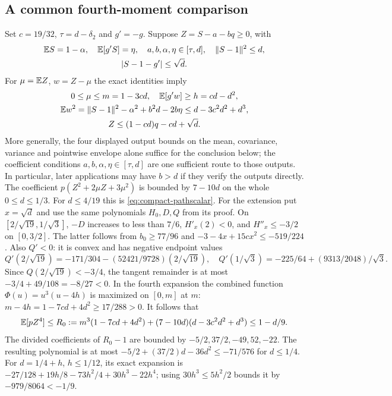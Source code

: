 \subsection{A common fourth-moment comparison}\label{calc:fourthcomparison}
Set $c=19/32$, $\tau=d-\delta_{2}$ and $g'=-g$. Suppose $Z=S-a-bq\ge0$, with
\begin{gather*}
 \mathbb E S=1-\alpha,\quad\mathbb E[g'S]=\eta,\quad
 a,b,\alpha,\eta\in[\tau,d],\quad\|S-1\|^2\le d,\\
 |S-1-g'|\le\sqrt d.
\end{gather*}
For $\mu=\mathbb E Z$, $w=Z-\mu$ the exact identities imply
\begin{gather*}
 0\le\mu\le m=1-3cd,\quad \mathbb E[g'w]\ge h=cd-d^2,\\
 \mathbb E w^2=\|S-1\|^2-\alpha^2+b^2d-2b\eta
                  \le d-3c^2d^2+d^3,\\
 Z\le(1-cd)q-cd+\sqrt d.
\end{gather*}
More generally, the four displayed output bounds on the mean, covariance,
variance and pointwise envelope alone suffice for the conclusion below;
the coefficient conditions $a,b,\alpha,\eta\in[\tau,d]$ are one
sufficient route to those outputs. In particular, later applications
may have $b>d$ if they verify the outputs directly.
The coefficient $p(Z^2+2\mu Z+3\mu^2)$ is bounded by $7-10d$ on the
whole $0\le d\le1/3$. For $d\le4/19$ this is
\eqref{eq:compact-pathscalar}. For the extension put $x=\sqrt d$ and use
the same polynomials $H_0,D,Q$ from its proof. On
$[2/\sqrt{19},1/\sqrt3]$, $-D$ increases to less than $7/6$,
$H'_x(2)<0$, and $H''_x\le-3/2$ on $[0,3/2]$.
The latter follows from $b_0\ge77/96$ and
$-3-4x+15cx^2\le-519/224$.
Also $Q'<0$: it is convex and has negative endpoint values
\[
 Q'(2/\sqrt{19})=-171/304-(52421/9728)(2/\sqrt{19}),\quad
 Q'(1/\sqrt3)=-225/64+(9313/2048)/\sqrt3.
\]
Since $Q(2/\sqrt{19})<-3/4$, the tangent remainder is at most
$-3/4+49/108=-8/27<0$.
In the fourth expansion the combined function
$\Phi(u)=u^3(u-4h)$ is maximized on $[0,m]$ at $m$:
$m-4h=1-7cd+4d^2\ge17/288>0$.
It follows that
\begin{equation}\label{eq:compact-fourth-comparison}
 \mathbb E[pZ^4]\le R_0:=m^3(1-7cd+4d^2)+(7-10d)(d-3c^2d^2+d^3)
 \le1-d/9.
\end{equation}
The divided coefficients of $R_0-1$ are bounded by
$-5/2,37/2,-49,52,-22$. The resulting polynomial is at most
$-5/2+(37/2)d-36d^2\le-71/576$ for $d\le1/4$.
For $d=1/4+h$, $h\le1/12$, its exact expansion is
$-27/128+19h/8-73h^2/4+30h^3-22h^4$;
using $30h^3\le5h^2/2$ bounds it by $-979/8064<-1/9$.

